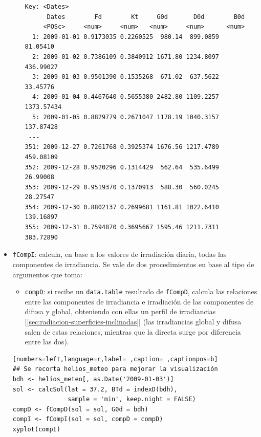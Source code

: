 \begin{itemize}
\begin{itemize}
\begin{verbatim}
Key: <Dates>
	  Dates        Fd        Kt     G0d       D0d        B0d
	 <POSc>     <num>     <num>   <num>     <num>      <num>
  1: 2009-01-01 0.9173035 0.2260525  980.14  899.0859   81.05410
  2: 2009-01-02 0.7386109 0.3840912 1671.80 1234.8097  436.99027
  3: 2009-01-03 0.9501390 0.1535268  671.02  637.5622   33.45776
  4: 2009-01-04 0.4467640 0.5655380 2482.80 1109.2257 1373.57434
  5: 2009-01-05 0.8829779 0.2671047 1178.19 1040.3157  137.87428
 ---                                                            
351: 2009-12-27 0.7261768 0.3925374 1676.56 1217.4789  459.08109
352: 2009-12-28 0.9520296 0.1314429  562.64  535.6499   26.99008
353: 2009-12-29 0.9519370 0.1370913  588.30  560.0245   28.27547
354: 2009-12-30 0.8802137 0.2699681 1161.81 1022.6410  139.16897
355: 2009-12-31 0.7594870 0.3695667 1595.46 1211.7311  383.72890
\end{verbatim}
\end{itemize}

\item \texttt{fCompI}: calcula, en base a los valores de irradiación diaria, todas las componentes de irradiancia. Se vale de dos procedimientos en base al tipo de argumentos que toma:
\begin{itemize}
\item \texttt{compD}: si recibe un \texttt{data.table} resultado de \texttt{fCompD}, calcula las relaciones entre las componentes de irradiancia e irradiación de las componentes de difusa y global, obteniendo con ellas un perfil de irradiancias [\ref{sec:radiacion-superficies-inclinadas}] (las irradiancias global y difusa salen de estas relaciones, mientras que la directa surge por diferencia entre las dos).
\end{itemize}
\begin{lstlisting}[numbers=left,language=r,label= ,caption= ,captionpos=b]
## Se recorta helios_meteo para mejorar la visualización
bdh <- helios_meteo[, as.Date('2009-01-03')]
sol <- calcSol(lat = 37.2, BTd = indexD(bdh),
               sample = 'min', keep.night = FALSE)
compD <- fCompD(sol = sol, G0d = bdh)
compI <- fCompI(sol = sol, compD = compD)
xyplot(compI)
\end{lstlisting}


\end{itemize}
